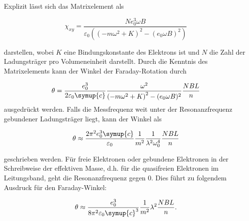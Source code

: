 
            Explizit lässt sich das Matrixelement als 

            \begin{equation}
                \chi_{xy} = \frac{N e_0^3 \omega B}
                {\varepsilon_0\left(\left(-m\omega^2+K\right)^2-(e_0\omega B)^2\right)}
            \end{equation}

            darstellen, wobei $K$ eine Bindungskonstante des Elektrons ist und $N$ die Zahl der 
            Ladungsträger pro Volumeneinheit darstellt. Durch die Kenntnis des Matrixelements 
            kann der Winkel der Faraday-Rotation durch 

            \begin{equation}
                \theta = \frac{e_0^3}{2\varepsilon_0\symup{c}}\frac{\omega^2}
                {\left(-m\omega^2 +K\right)^2-(e_0\omega B)^2}\frac{NBL}{n}
            \end{equation}
            ausgedrückt werden. Falls die Messfrequenz weit unter der Resonanzfrequenz 
            gebundener Ladungsträger liegt, kann der Winkel als 

            \begin{equation}
                \theta \approx \frac{2\pi^2e_0^3\symup{c}}{\varepsilon_0}\frac1{m^2}
                \frac1{\lambda^2\omega_0^4}\frac{NBL}n
            \end{equation}

            geschrieben werden. Für freie Elektronen oder gebundene Elektronen in der Schreibweise der 
            effektiven Masse, d.h. f\"ur die quasifreien Elektronen
            im Leitungsband,  geht die Resonanzfrequenz gegen 0.
            Dies führt zu folgendem Ausdruck für den 
            Faraday-Winkel:

            \begin{equation}
                \theta \approx \frac{e_0^3}{8\pi^2\varepsilon_0\symup{c}^3}\frac1{m^2}\lambda^2\frac{NBL}n.
            \end{equation}
